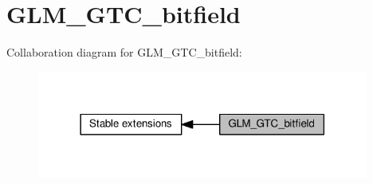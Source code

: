 \hypertarget{group__gtc__bitfield}{}\section{G\+L\+M\+\_\+\+G\+T\+C\+\_\+bitfield}
\label{group__gtc__bitfield}
Collaboration diagram for G\+L\+M\+\_\+\+G\+T\+C\+\_\+bitfield\+:
\nopagebreak
\begin{figure}[H]
\begin{center}
\leavevmode
\includegraphics[width=309pt]{da/d5e/group__gtc__bitfield}
\end{center}
\end{figure}
